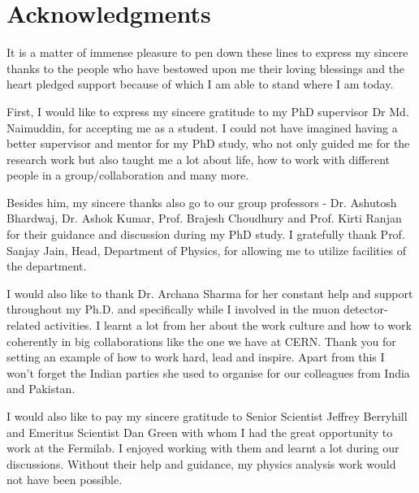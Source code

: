 
\chapter*{Acknowledgments}
It is a matter of immense pleasure to pen down these lines to express my sincere thanks to the people who have bestowed upon me their loving blessings and the heart pledged support because of which I am able to stand where I am today.

First, I would like to express my sincere gratitude to my PhD supervisor Dr Md. Naimuddin, for accepting me as a student. I could not have imagined having a better supervisor and mentor for my PhD study, who not only guided me for the research work but also taught me a lot about life, how to work with different people in a group/collaboration and many more.

Besides him, my sincere thanks also go to our group professors - Dr. Ashutosh Bhardwaj, Dr. Ashok Kumar, Prof. Brajesh Choudhury and Prof. Kirti Ranjan for their guidance and discussion during my PhD study. I gratefully thank Prof. Sanjay Jain, Head, Department of Physics, for allowing me to utilize facilities of the department. 


I would also like to thank Dr. Archana Sharma for her constant help and support throughout my Ph.D. and specifically while I involved in the muon detector-related activities. I learnt a lot from her about the work culture and how to work coherently in big collaborations like the one we have at CERN. Thank you for setting an example of how to work hard, lead and inspire. Apart from this I won't forget the Indian parties she used to organise for our colleagues from  India and Pakistan. 

I would also like to pay my sincere gratitude to Senior Scientist Jeffrey Berryhill and Emeritus Scientist Dan Green with whom I had the great opportunity to work at the Fermilab. I enjoyed working with them and learnt a lot during our  discussions. Without their help and guidance, my physics analysis work would not have been possible.

